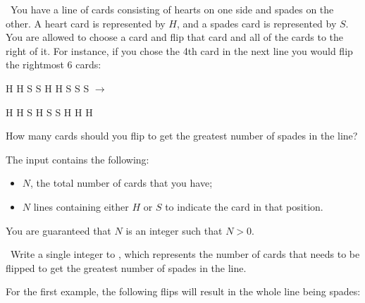 
\Question\ You have a line of cards consisting of hearts on one side and spades
on the other. A heart card is represented by $H$, and a spades card is represented
by $S$. You are allowed to choose a card and flip that card and all of the cards 
to the right of it. For instance, if you chose the 4th card in the next line
you would flip the rightmost 6 cards:

H H S S H H S S S $\rightarrow$

H H S H S S H H H

How many cards should you flip to get the greatest number of spades in the line?

\Input

The input contains the following:
\begin{itemize}
    \item $N$, the total number of cards that you have;
    \item $N$ lines containing either $H$ or $S$ to indicate the card in that position.
\end{itemize}

You are guaranteed that $N$ is an integer such that $N > 0$.

\Output\ Write a single integer to \OUT, which represents the number of cards that
needs to be flipped to get the greatest number of spades in the line.

\Sample
{}

\Explanation For the first example, the following flips will result in the whole
line being spades:

